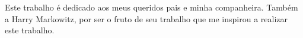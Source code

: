 Este trabalho é dedicado aos meus queridos pais e minha companheira. Também a Harry Markowitz, por ser o fruto de seu trabalho que me inspirou a realizar este trabalho.